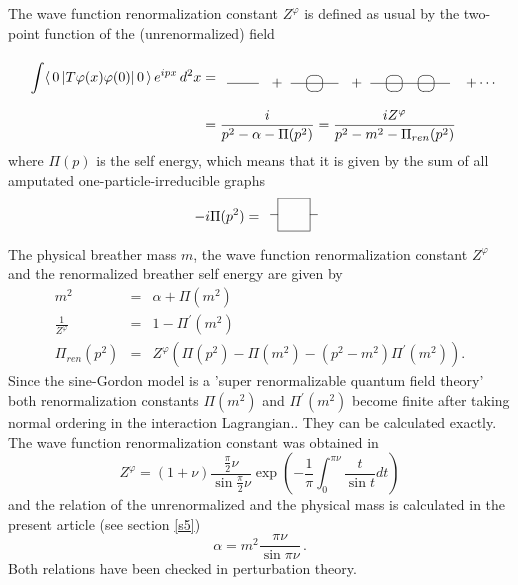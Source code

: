 \documentclass[a4paper,a4paper]{article}
\begin{document}
The wave function renormalization constant $Z^{\varphi }$ is defined as
usual by the two-point function of the (unrenormalized) field 
\begin{align*}
\int \langle \,0\left| T\varphi (x)\varphi (0)\right| 0\,\rangle
\,e^{ipx}\,d^{2}x& = 
\begin{array}{l}
\unitlength4mm\begin{picture}(16,3) \put(0,1){\line(1,0){2}}
\put(2.8,.8){$+$} \put(4,1){\line(1,0){3}} \put(5.5,1){\oval(1,1)}
\put(7.8,.8){$+$} \put(9,1){\line(1,0){5}} \put(10.5,1){\oval(1,1)}
\put(12.5,1){\oval(1,1)} \put(15,.8){$+\cdots$} \end{picture}
\end{array}
\\
& =\dfrac{i}{p^{2}-\alpha -\Pi (p^{2})}=\dfrac{iZ^{\varphi }}{%
p^{2}-m^{2}-\Pi _{ren}(p^{2})}
\end{align*}
where $\Pi (p)$ is the self energy, which means that it is given by the sum
of all amputated one-particle-irreducible graphs 
\[
-i\Pi (p^{2})= 
\begin{array}{c}
\unitlength4mm \begin{picture}(3,2)
\put(0,1){\line(1,0){.5}}\put(2.5,1){\line(1,0){.5}}
\put(.5,0){\framebox(2,2){}} \end{picture}
\end{array}
\]
The physical breather mass $m$, the wave function renormalization constant $%
Z^{\varphi }$ and the renormalized breather self energy are given by 
\begin{eqnarray*}
m^{2} &=&\alpha +\Pi (m^{2}) \\
\frac{1}{Z^{\varphi }} &=&1-\Pi ^{\prime }(m^{2}) \\
\Pi _{ren}(p^{2}) &=&Z^{\varphi }\left( \Pi (p^{2})-\Pi (m^{2})-\left(
p^{2}-m^{2}\right) \Pi ^{\prime }(m^{2})\right) .
\end{eqnarray*}
Since the sine-Gordon model is a 'super renormalizable quantum field theory'
both renormalization constants $\Pi (m^{2})$ and $\Pi ^{\prime }(m^{2})$
become finite after taking normal ordering in the interaction Lagrangian..
They can be calculated exactly. The wave function renormalization constant
was obtained in \cite{KW} 
\begin{equation}
Z^{\varphi }=(1+\nu )\frac{\frac{\pi }{2}\nu }{\sin \frac{\pi }{2}\nu }\exp
\left( -\frac{1}{\pi }\int_{0}^{\pi \nu }\frac{t}{\sin t}dt\right)  \label{Z}
\end{equation}
and the relation of the unrenormalized and the physical mass is calculated
in the present article (see section \ref{s5}) 
\[
\alpha =m^{2}\frac{\pi \nu }{\sin \pi \nu }\,. 
\]
Both relations have been checked in perturbation theory.
\end{document}

